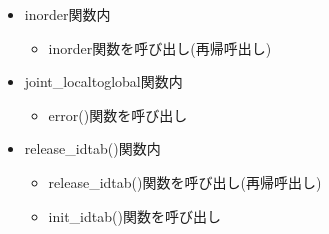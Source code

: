 \documentclass{jarticle}
\begin{document}
\begin{itemize}
\begin{itemize}
    \item inorder関数内
    \begin{itemize}
      \item inorder関数を呼び出し(再帰呼出し)
    \end{itemize}
    \item joint\_localtoglobal関数内
    \begin{itemize}
      \item error()関数を呼び出し
    \end{itemize}
    \item release\_idtab()関数内
    \begin{itemize}
      \item release\_idtab()関数を呼び出し(再帰呼出し)
      \item init\_idtab()関数を呼び出し
    \end{itemize}
  \end{itemize}
\end{itemize}
\end{document}
